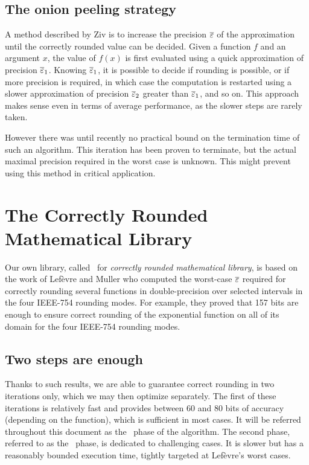\subsection{The onion peeling strategy}

A method described by Ziv \cite{Ziv91} is to increase the precision
${\overline{\varepsilon}}$ of the approximation until the correctly rounded value can
be decided.  Given a function $f$ and an argument $x$, the value of
$f(x)$ is first evaluated using a quick approximation of precision
${\overline{\varepsilon}}_1$.  Knowing ${\overline{\varepsilon}}_1$, it is possible to decide if
rounding is possible, or if more precision is required, in which case
the computation is restarted using a slower approximation of precision
${\overline{\varepsilon}}_2$ greater than ${\overline{\varepsilon}}_1$, and so on. This approach makes
sense even in terms of average performance, as the slower steps are
rarely taken.

However there was until recently no practical bound on the termination
time of such an algorithm. This iteration has been proven to
terminate, but the actual maximal precision required in the worst case
is unknown.  This might prevent using this method in critical
application.




\section{The Correctly Rounded Mathematical Library}
\label{section:crlibm-presentation}

Our own library, called \crlibm\ for \emph{correctly rounded
  mathematical library}, is based on the work of
Lef\`evre and Muller \cite{LMT98,Lef2000} who computed the worst-case ${\overline{\varepsilon}}$
required for correctly rounding several functions in double-precision
over selected intervals in the four IEEE-754 rounding modes. For
example, they proved that 157 bits are enough to ensure correct rounding
of the exponential function on all of its domain for the four IEEE-754
rounding modes.

\subsection{Two steps are enough}
Thanks to such results, we are able to guarantee correct rounding in
two iterations only, which we may then optimize separately. The first
of these iterations is relatively fast and provides between 60 and 80
bits of accuracy (depending on the function), which is sufficient in
most cases. It will be referred throughout this document as the \quick\ 
phase of the algorithm. The second phase, referred to as the
\accurate\ phase, is dedicated to challenging cases. It is slower but
has a reasonably bounded execution time, tightly targeted at
Lef\`evre's worst cases.

